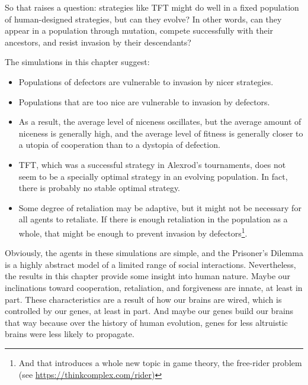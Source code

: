 \documentclass[12pt]{book}
\theoremstyle{exercise}
\begin{document}
So that raises a question: strategies like TFT might do well in a fixed population of human-designed strategies, but can they evolve?  In other words, can they appear in a population through mutation, compete successfully with their ancestors, and resist invasion by their descendants?

The simulations in this chapter suggest:

\begin{itemize}

\item Populations of defectors are vulnerable to invasion by nicer strategies.

\item Populations that are too nice are vulnerable to invasion by defectors.

\item As a result, the average level of niceness oscillates, but the average amount of niceness is generally high, and the average level of fitness is generally closer to a utopia of cooperation than to a dystopia of defection.

\item TFT, which was a successful strategy in Alexrod's tournaments, does not seem to be a specially optimal strategy in an evolving population.  In fact, there is probably no stable optimal strategy.

\item Some degree of retaliation may be adaptive, but it might not be
necessary for all agents to retaliate.  If there is enough retaliation in the population as a whole, that might be enough to prevent invasion by defectors\footnote{And that introduces a whole new topic in game theory, the free-rider problem (see \url{https://thinkcomplex.com/rider})}.

\end{itemize}

Obviously, the agents in these simulations are simple, and the Prisoner's Dilemma is a highly abstract model of a limited range of social interactions.  Nevertheless, the results in this chapter provide some insight into human nature.  Maybe our inclinations toward cooperation, retaliation, and forgiveness are innate, at least in part.  These characteristics are a result of how our brains are wired, which is controlled by our genes, at least in part.  And maybe our genes build our brains that way because over the history of human evolution, genes for less altruistic brains were less likely to propagate.

\end{document}

